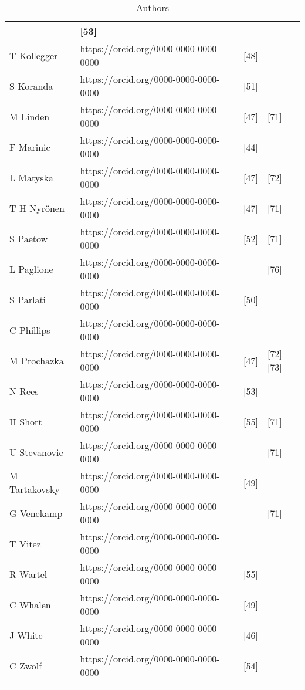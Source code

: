 \begin{center}
\begin{longtable}{|p{2.5cm}|p{5.6cm}|p{3.5cm}|p{3.8cm}|}
&[53]
&\\
\hline
T Kollegger
&https://orcid.org/0000-0000-0000-0000
&[48]
&\\
\hline
S Koranda 
&https://orcid.org/0000-0000-0000-0000
&[51]
&\\
\hline
M Linden
&https://orcid.org/0000-0000-0000-0000
&[47]
&[71]\\
\hline
F Marinic
&https://orcid.org/0000-0000-0000-0000
&[44]
&\\
\hline
L Matyska
&https://orcid.org/0000-0000-0000-0000
&[47]
&[72]\\
\hline
T H Nyrönen
&https://orcid.org/0000-0000-0000-0000
&[47]
&[71]\\
\hline
S Paetow 
&https://orcid.org/0000-0000-0000-0000
&[52]
&[71]\\
\hline
L Paglione
&https://orcid.org/0000-0000-0000-0000
&
&[76]\\
\hline
S Parlati
&https://orcid.org/0000-0000-0000-0000
&[50]
&\\
\hline
C Phillips
&https://orcid.org/0000-0000-0000-0000
&
&\\
\hline
M Prochazka
&https://orcid.org/0000-0000-0000-0000
&[47]
&[72][73]\\
\hline
N Rees
&https://orcid.org/0000-0000-0000-0000
&[53]
&\\
\hline
H Short
&https://orcid.org/0000-0000-0000-0000
&[55]
&[71]\\
\hline
U Stevanovic
&https://orcid.org/0000-0000-0000-0000
&
&[71]\\
\hline
M Tartakovsky 
&https://orcid.org/0000-0000-0000-0000
&[49]
&\\
\hline
G Venekamp
&https://orcid.org/0000-0000-0000-0000
&
&[71]\\
\hline
T Vitez
&https://orcid.org/0000-0000-0000-0000
&
&\\
\hline
R Wartel
&https://orcid.org/0000-0000-0000-0000
&[55]
&\\
\hline
C Whalen
&https://orcid.org/0000-0000-0000-0000
&[49]
&\\
\hline
J White
&https://orcid.org/0000-0000-0000-0000
&[46]
&\\
\hline
C Zwolf
&https://orcid.org/0000-0000-0000-0000
&[54]
&\\
\hline
                                       
\caption{Authors}
\label{tab:matrix}
\end{longtable}
\end{center}


